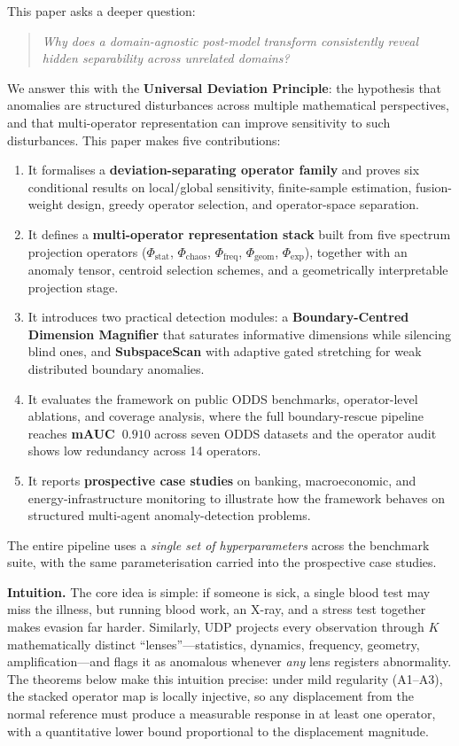 \documentclass[journal]{IEEEtran}
\begin{document}
This paper asks a deeper question:

\begin{quote}
\textit{Why does a domain-agnostic post-model transform consistently reveal hidden separability across unrelated domains?}
\end{quote}

We answer this with the \textbf{Universal Deviation Principle}: the hypothesis that anomalies are structured disturbances across multiple mathematical perspectives, and that multi-operator representation can improve sensitivity to such disturbances. This paper makes five contributions:

\begin{enumerate}
  \item It formalises a \textbf{deviation-separating operator family} and proves six conditional results on local/global sensitivity, finite-sample estimation, fusion-weight design, greedy operator selection, and operator-space separation.
  \item It defines a \textbf{multi-operator representation stack} built from five spectrum projection operators ($\Phi_{\text{stat}}$, $\Phi_{\text{chaos}}$, $\Phi_{\text{freq}}$, $\Phi_{\text{geom}}$, $\Phi_{\text{exp}}$), together with an anomaly tensor, centroid selection schemes, and a geometrically interpretable projection stage.
  \item It introduces two practical detection modules: a \textbf{Boundary-Centred Dimension Magnifier} that saturates informative dimensions while silencing blind ones, and \textbf{SubspaceScan} with adaptive gated stretching for weak distributed boundary anomalies.
  \item It evaluates the framework on public ODDS benchmarks, operator-level ablations, and coverage analysis, where the full boundary-rescue pipeline reaches \textbf{mAUC~$0.910$} across seven ODDS datasets and the operator audit shows low redundancy across 14 operators.
  \item It reports \textbf{prospective case studies} on banking, macroeconomic, and energy-infrastructure monitoring to illustrate how the framework behaves on structured multi-agent anomaly-detection problems.
\end{enumerate}

The entire pipeline uses a \textit{single set of hyperparameters} across the benchmark suite, with the same parameterisation carried into the prospective case studies.

\textbf{Intuition.} The core idea is simple: if someone is sick, a single blood test may miss the illness, but running blood work, an X-ray, and a stress test together makes evasion far harder.  Similarly, UDP projects every observation through $K$ mathematically distinct ``lenses''---statistics, dynamics, frequency, geometry, amplification---and flags it as anomalous whenever \emph{any} lens registers abnormality.  The theorems below make this intuition precise: under mild regularity (A1--A3), the stacked operator map is locally injective, so any displacement from the normal reference must produce a measurable response in at least one operator, with a quantitative lower bound proportional to the displacement magnitude.
\end{document}
